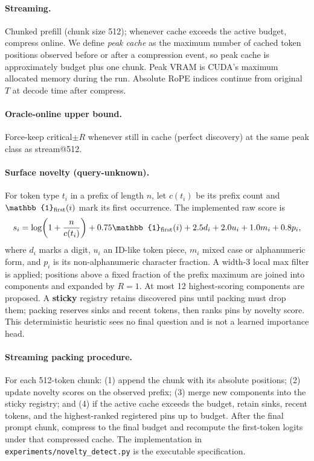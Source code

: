 \documentclass[11pt,a4paper]{article}
\begin{document}
\paragraph{Streaming.}
Chunked prefill (chunk size 512); whenever cache exceeds the active budget, compress online. We define \emph{peak cache} as the maximum number of cached token positions observed before or after a compression event, so peak cache is approximately budget plus one chunk. Peak VRAM is CUDA's maximum allocated memory during the run. Absolute RoPE indices continue from original $T$ at decode time after compress.

\paragraph{Oracle-online upper bound.}
Force-keep critical$\pm R$ whenever still in cache (perfect discovery) at the same peak class as stream@512.

\paragraph{Surface novelty (query-unknown).}
For token type $t_i$ in a prefix of length $n$, let $c(t_i)$ be its prefix count and $\mathbb{1}_{\rm first}(i)$ mark its first occurrence. The implemented raw score is
\[
s_i=\log\!\left(1+\frac{n}{c(t_i)}\right)+0.75\mathbb{1}_{\rm first}(i)
+2.5d_i+2.0u_i+1.0m_i+0.8p_i,
\]
where $d_i$ marks a digit, $u_i$ an ID-like token piece, $m_i$ mixed case or alphanumeric form, and $p_i$ is its non-alphanumeric character fraction. A width-3 local max filter is applied; positions above a fixed fraction of the prefix maximum are joined into components and expanded by $R=1$. At most 12 highest-scoring components are proposed. A \textbf{sticky} registry retains discovered pins until packing must drop them; packing reserves sinks and recent tokens, then ranks pins by novelty score. This deterministic heuristic sees no final question and is not a learned importance head.

\paragraph{Streaming packing procedure.}
For each 512-token chunk: (1) append the chunk with its absolute positions; (2) update novelty scores on the observed prefix; (3) merge new components into the sticky registry; and (4) if the active cache exceeds the budget, retain sinks, recent tokens, and the highest-ranked registered pins up to budget. After the final prompt chunk, compress to the final budget and recompute the first-token logits under that compressed cache. The implementation in \texttt{experiments/novelty\_detect.py} is the executable specification.
\end{document}
